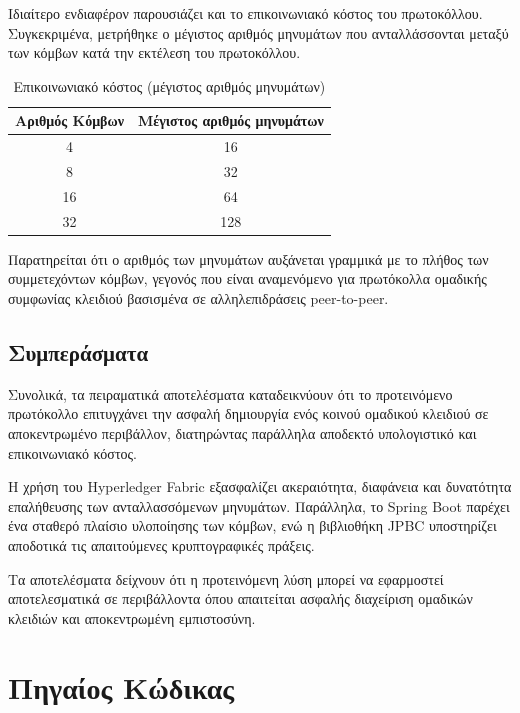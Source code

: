 \documentclass[12pt,a4paper]{report}
\begin{document}
Ιδιαίτερο ενδιαφέρον παρουσιάζει και το επικοινωνιακό κόστος του πρωτοκόλλου.
Συγκεκριμένα, μετρήθηκε ο μέγιστος αριθμός μηνυμάτων που ανταλλάσσονται μεταξύ των κόμβων κατά την εκτέλεση του πρωτοκόλλου.

\begin{table}[H]
\centering
\caption{Επικοινωνιακό κόστος (μέγιστος αριθμός μηνυμάτων)}
\label{tab:messages}
\begin{tabular}{|c|c|}
\hline
Αριθμός Κόμβων & Μέγιστος αριθμός μηνυμάτων\\
\hline
4  & 16 \\
8  & 32 \\
16 & 64 \\
32 & 128 \\
\hline
\end{tabular}
\end{table}

Παρατηρείται ότι ο αριθμός των μηνυμάτων αυξάνεται γραμμικά με το πλήθος των συμμετεχόντων κόμβων, γεγονός που είναι αναμενόμενο για πρωτόκολλα ομαδικής συμφωνίας κλειδιού βασισμένα σε αλληλεπιδράσεις peer-to-peer.

\section{Συμπεράσματα}

Συνολικά, τα πειραματικά αποτελέσματα καταδεικνύουν ότι το προτεινόμενο πρωτόκολλο επιτυγχάνει την ασφαλή δημιουργία ενός κοινού ομαδικού κλειδιού σε αποκεντρωμένο περιβάλλον, διατηρώντας παράλληλα αποδεκτό υπολογιστικό και επικοινωνιακό κόστος.

Η χρήση του Hyperledger Fabric  εξασφαλίζει ακεραιότητα, διαφάνεια και δυνατότητα επαλήθευσης των ανταλλασσόμενων μηνυμάτων.
Παράλληλα, το Spring Boot  παρέχει ένα σταθερό πλαίσιο υλοποίησης των κόμβων, ενώ η βιβλιοθήκη JPBC υποστηρίζει αποδοτικά τις απαιτούμενες κρυπτογραφικές πράξεις.

Τα αποτελέσματα δείχνουν ότι η προτεινόμενη λύση μπορεί να εφαρμοστεί αποτελεσματικά σε περιβάλλοντα όπου απαιτείται ασφαλής διαχείριση ομαδικών κλειδιών και αποκεντρωμένη εμπιστοσύνη.
\chapter{Πηγαίος Κώδικας}
\end{document}
